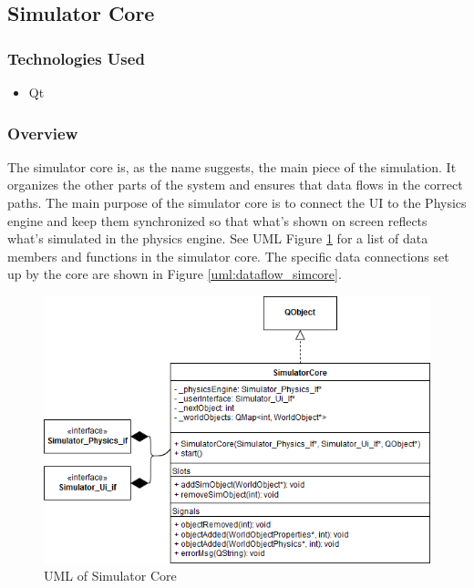 \subsection{Simulator Core}

\subsubsection*{Technologies Used}
\begin{itemize}
	\item Qt
\end{itemize}

\subsubsection*{Overview}
The simulator core is, as the name suggests, the main piece of the simulation. It organizes the other parts of the system and ensures that data flows in the correct paths. The main purpose of the simulator core is to connect the UI to the Physics engine and keep them synchronized so that what's shown on screen reflects what's simulated in the physics engine. See UML Figure \ref{uml:simcore} for a list of data members and functions in the simulator core. The specific data connections set up by the core are shown in Figure \ref{uml:dataflow_simcore}.

 
 \begin{figure}[h]
 	\begin{center}
 	\includegraphics[scale=0.5]{./images_design/uml/SimCore}
 	\caption{UML of Simulator Core\label{uml:simcore}}
 	\end{center}
 \end{figure}

